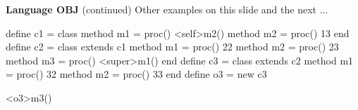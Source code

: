 \begin{minipage}[t]{\sw}
\slidenumber
\LARGE
{\bf Language OBJ} (continued)\exx
Other examples on this slide and the next ...
{\Large
\begin{qv}
define c1 =
  class
    method m1 = proc() <self>m2()
    method m2 = proc() 13
  end
define c2 =
  class extends c1
    method m1 = proc() 22
    method m2 = proc() 23
    method m3 = proc() <super>m1()
  end
define c3 =
  class extends c2
    method m1 = proc() 32
    method m2 = proc() 33
  end
define o3 = new c3

<o3>m3()  %
\end{qv}
}
\end{minipage}
